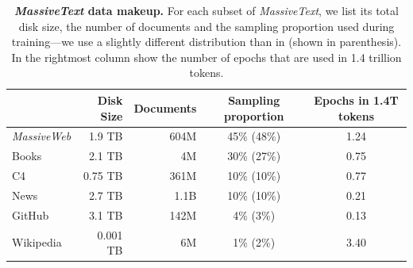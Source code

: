 \documentclass[11pt, a4paper, logo, copyright, nonumbering]{deepmind}
\newcommand{\massivetext}{\textit{MassiveText}\xspace}
\newcommand{\massiveweb}{\textit{MassiveWeb}\xspace}
\begin{document}
\begin{table}[h!]
\centering
\begin{tabular}{l r r c c}
\toprule
           & Disk Size & Documents  & Sampling proportion & Epochs in 1.4T tokens  \\ 
\midrule
\massiveweb & 1.9 TB  & 604M  & 45\% (48\%) & 1.24\\
Books       & 2.1 TB  & 4M   & 30\% (27\%) & 0.75 \\
C4          & 0.75 TB  & 361M  & 10\% (10\%) & 0.77 \\
News        & 2.7 TB  & 1.1B  & 10\% (10\%)& 0.21\\
GitHub      & 3.1 TB  & 142M & 4\% (3\%) & 0.13 \\ 
Wikipedia   & 0.001 TB & 6M    & 1\% (2\%) & 3.40 \\
\bottomrule
\end{tabular}
    \caption{\textbf{\massivetext data makeup.} For each subset of \massivetext, we list its total disk size, the number of documents and the sampling proportion used during training---we use a slightly different distribution than in \citet{rae2021gopher} (shown in parenthesis). In the rightmost column show the number of epochs that are used in 1.4 trillion tokens.
    }
    \label{tab:data_makeup}
\end{table}
\end{document}
